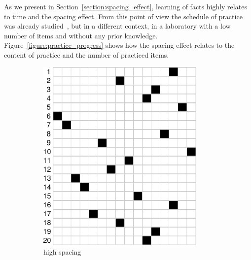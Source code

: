 \documentclass[table,color,cover,twoside,nolot,nolof]{fithesis3/fithesis3}
\begin{document}
As we present in Section~\ref{section:spacing_effect}, learning of facts highly
relates to time and the spacing effect. From this point of view the schedule of
practice was already studied~\cite{pavlik2008schedule}, but in a different
context, in a laboratory with a low number of items and without any prior
knowledge. Figure~\ref{figure:practice_progress} shows how the spacing effect
relates to the content of practice and the number of practiced items.

\begin{figure}
	\begin{subfigure}[b]{.5\textwidth}
		\centering
		\includegraphics[width=0.9\textwidth]{figure/practice_progress_a}
		\caption{high spacing}
		\label{figure:practice_progress_a}
	\end{subfigure}
	\begin{subfigure}[b]{.5\textwidth}
		\centering

\end{subfigure}
\end{figure}
\end{document}
